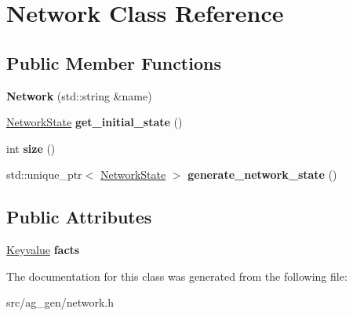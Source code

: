 \hypertarget{class_network}{}\section{Network Class Reference}
\label{class_network}
\subsection*{Public Member Functions}
\begin{DoxyCompactItemize}
\item 
\mbox{\label{class_network_a3cb970fdbad7e8156db8df8951bfb18a}} 
{\bfseries Network} (std\+::string \&name)
\item 
\mbox{\label{class_network_a979bd0fe04eba3b46e0bf6e03b53efd1}} 
\mbox{\hyperlink{class_network_state}{Network\+State}} {\bfseries get\+\_\+initial\+\_\+state} ()
\item 
\mbox{\label{class_network_a0da93244ee6aa2c51af37aa193481330}} 
int {\bfseries size} ()
\item 
\mbox{\label{class_network_ac2dd899d3e405c04a7fcccac7ce0ac5d}} 
std\+::unique\+\_\+ptr$<$ \mbox{\hyperlink{class_network_state}{Network\+State}} $>$ {\bfseries generate\+\_\+network\+\_\+state} ()
\end{DoxyCompactItemize}
\subsection*{Public Attributes}
\begin{DoxyCompactItemize}
\item 
\mbox{\label{class_network_a9d5dd21d0a010bb4fba5387d866880ac}} 
\mbox{\hyperlink{class_keyvalue}{Keyvalue}} {\bfseries facts}
\end{DoxyCompactItemize}


The documentation for this class was generated from the following file\+:\begin{DoxyCompactItemize}
\item 
src/ag\+\_\+gen/network.\+h\end{DoxyCompactItemize}
